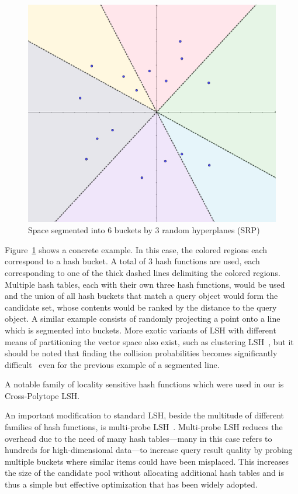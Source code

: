 \begin{figure}[tp]
  \centering
  \includegraphics[width=.6\textwidth]{img/srp}
  \caption{Space segmented into 6 buckets by 3 random hyperplanes (SRP)}
  \label{fig:srp}
\end{figure}

Figure~\ref{fig:srp} shows a concrete example. In this case, the colored
regions each correspond to a hash bucket. A total of 3 hash functions are used,
each corresponding to one of the thick dashed lines delimiting the colored regions. Multiple
hash tables, each with their own three hash functions, would be used and the
union of all hash buckets that match a query object would form the candidate
set, whose contents would be ranked by the distance to the query object. A
similar example consists of randomly projecting a point onto a line which is
segmented into buckets. More exotic variants of LSH with different means of
partitioning the vector space also exist, such as clustering
LSH~\cite{lshcomp}, but it should be noted that finding the collision
probabilities becomes significantly difficult~\cite{pstablelsh} even for the
previous example of a segmented line.

A notable family of locality sensitive hash functions which were used in our is
Cross-Polytope LSH. %

An important modification to standard LSH, beside the multitude of different
families of hash functions, is multi-probe LSH~\cite{multiprobelsh}. Multi-probe
LSH reduces the overhead due to the need of many hash tables---many in this
case refers to hundreds for high-dimensional data---to increase query result
quality by probing multiple buckets where similar items could have been
misplaced. This increases the size of the candidate pool without allocating
additional hash tables and is thus a simple but effective optimization that has
been widely adopted.

